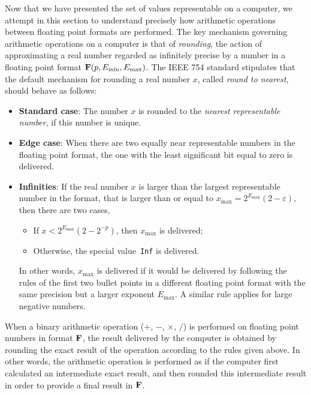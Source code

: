 Now that we have presented the set of values representable on a computer,
we attempt in this section to understand precisely how arithmetic operations between floating point formats are performed.
The key mechanism governing arithmetic operations on a computer is that of \emph{rounding},
the action of approximating a real number regarded as infinitely precise by a number in a floating point format $\mathbf F (p, E_{\min}, E_{\max})$.
The IEEE 754 standard stipulates that the default mechanism for rounding a real number $x$,
called \emph{round to nearest},
should behave as follows:
\begin{itemize}
    \item
        \textbf{Standard case}:
        The number $x$ is rounded to the \emph{nearest representable number},
        if this number is unique.
    \item
        \textbf{Edge case}:
        When there are two equally near representable numbers in the floating point format,
        the one with the least significant bit equal to zero is delivered.
    \item
        \textbf{Infinities}:
        If the real number $x$ is larger than the largest representable number in the format,
        that is larger than or equal to $x_{\max} = 2^{E_{\max}} (2 - \varepsilon)$,
        then there are two cases,
        \begin{itemize}
            \item If $x < 2^{E_{\max}} (2 - 2^{-p})$, then $x_{\max}$ is delivered;
            \item Otherwise, the special value~\texttt{Inf} is delivered.
        \end{itemize}
        In other words, $x_{\max}$ is delivered if it would be delivered by following the rules of the first two bullet points
        in a different floating point format with the same precision but a larger exponent $E_{\max}$.
        A similar rule applies for large negative numbers.
\end{itemize}

When a binary arithmetic operation ($+$, $-$, $\times$, $/$) is performed on floating point numbers in format $\mathbf F$,
the result delivered by the computer is obtained by rounding the exact result of the operation according to the rules given above.
In other words,
the arithmetic operation is performed as if the computer first calculated an intermediate exact result,
and then rounded this intermediate result in order to provide a final result in $\mathbf F$.

